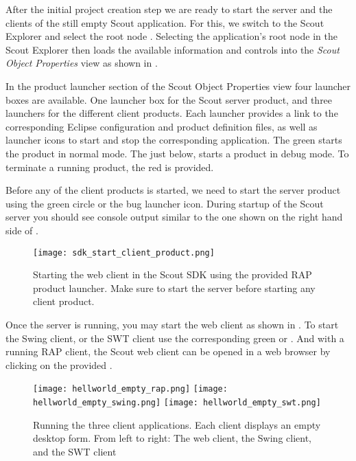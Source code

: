 %

After the initial project creation step we are ready to start the server and the clients of the still empty Scout application.
For this, we switch to the Scout Explorer and select the root node .
Selecting the application's root node in the Scout Explorer then loads the available information and controls into the \textit{Scout Object Properties} view as shown in .

In the product launcher section of the Scout Object Properties view four launcher boxes are available. 
One launcher box for the Scout server product, and three launchers for the different client products.
Each launcher provides a link to the corresponding Eclipse configuration and product definition files, as well as launcher icons to start and stop the corresponding application.
The green  starts the product in normal mode.
The  just below, starts a product in debug mode.
To terminate a running product, the red  is provided. 

Before any of the client products is started, we need to start the server product using the green circle or the bug launcher icon.
During startup of the Scout server you should see console output similar to the one shown on the right hand side of .

\begin{figure}
\texttt{[image: sdk\_start\_client\_product.png]} 
\caption{Starting the web client in the Scout SDK using the provided RAP product launcher. Make sure to start the server before starting any client product.}
\end{figure}

Once the server is running, you may start the web client as shown in .
To start the Swing client, or the SWT client use the corresponding green  or .
And with a running RAP client, the Scout web client can be opened in a web browser by clicking on the provided .

\begin{figure}
\texttt{[image: hellworld\_empty\_rap.png]} \hspace{3mm}
\texttt{[image: hellworld\_empty\_swing.png]} \hspace{3mm}
\texttt{[image: hellworld\_empty\_swt.png]}
\caption{Running the three client applications. 
Each client displays an empty desktop form. 
From left to right: The web client, the Swing client, and the SWT client}
\end{figure}

